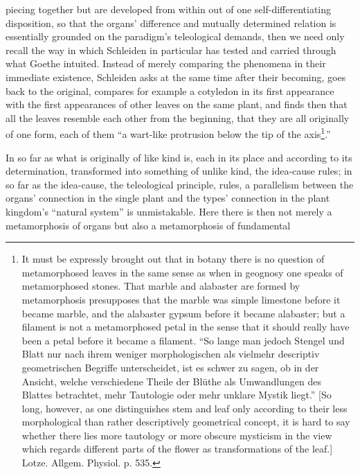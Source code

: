 \documentclass[12pt,a4paper]{book}
\begin{document}
\setcounter{footnote}{0}
piecing together but are developed from within out of one self-differentiating
disposition, so that the organs' difference and mutually determined relation is
essentially grounded on the paradigm's teleological demands, then we need only
recall the way in which Schleiden in particular has tested and carried through what
Goethe intuited. Instead of merely comparing the phenomena in their immediate
existence, Schleiden asks at the same time after their becoming, goes back to the
original, compares for example a cotyledon in its first appearance with the first
appearances of other leaves on the same plant, and finds then that all the leaves
resemble each other from the beginning, that they are all originally of one form,
each of them ``a wart-like protrusion below the tip of the
axis\footnote{%
It must be expressly brought out that in botany there is no question of
metamorphosed leaves in the same sense as when in geognosy one speaks of
metamorphosed stones. That marble and alabaster are formed by metamorphosis
presupposes that the marble was simple limestone before it became marble, and the
alabaster gypsum before it became alabaster; but a filament is not a metamorphosed
petal in the sense that it should really have been a petal before it became a
filament. ``So lange man jedoch Stengel und Blatt nur nach ihrem weniger
morphologischen als vielmehr descriptiv geometrischen Begriffe unterscheidet, ist
es schwer zu sagen, ob in der Ansicht, welche verschiedene Theile der Blüthe als
Umwandlungen des Blattes betrachtet, mehr Tautologie oder mehr unklare Mystik
liegt.'' [So long, however, as one distinguishes stem and leaf only according to
their less morphological than rather descriptively geometrical concept, it is hard
to say whether there lies more tautology or more obscure mysticism in the view
which regards different parts of the flower as transformations of the leaf.] Lotze.
Allgem. Physiol. p. 535.}.''

In so far as what is originally of like kind is, each in its place and according to
its determination, transformed into something of unlike kind, the idea-cause rules;
in so far as the idea-cause, the teleological principle, rules, a parallelism
between the organs' connection in the single plant and the types' connection in the
plant kingdom's ``natural system'' is unmistakable. Here there is then not merely a
metamorphosis of organs but also a metamorphosis of fundamental
\end{document}
